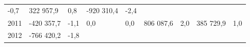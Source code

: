 \begin{longtable}[]{@{}lllllllll@{}}
\begin{minipage}[t]{0.06\columnwidth}
-0,7\strut
\end{minipage} & \begin{minipage}[t]{0.12\columnwidth}\raggedright
322 957,9\strut
\end{minipage} & \begin{minipage}[t]{0.06\columnwidth}\raggedright
0,8\strut
\end{minipage} & \begin{minipage}[t]{0.10\columnwidth}\raggedright
-920 310,4\strut
\end{minipage} & \begin{minipage}[t]{0.06\columnwidth}\raggedright
-2,4\strut
\end{minipage}\tabularnewline
\begin{minipage}[t]{0.05\columnwidth}\raggedright
2011\strut
\end{minipage} & \begin{minipage}[t]{0.10\columnwidth}\raggedright
-420 357,7\strut
\end{minipage} & \begin{minipage}[t]{0.06\columnwidth}\raggedright
-1,1\strut
\end{minipage} & \begin{minipage}[t]{0.16\columnwidth}\raggedright
0,0\strut
\end{minipage} & \begin{minipage}[t]{0.06\columnwidth}\raggedright
0,0\strut
\end{minipage} & \begin{minipage}[t]{0.12\columnwidth}\raggedright
806 087,6\strut
\end{minipage} & \begin{minipage}[t]{0.06\columnwidth}\raggedright
2,0\strut
\end{minipage} & \begin{minipage}[t]{0.10\columnwidth}\raggedright
385 729,9\strut
\end{minipage} & \begin{minipage}[t]{0.06\columnwidth}\raggedright
1,0\strut
\end{minipage}\tabularnewline
\begin{minipage}[t]{0.05\columnwidth}\raggedright
2012\strut
\end{minipage} & \begin{minipage}[t]{0.10\columnwidth}\raggedright
-766 420,2\strut
\end{minipage} & \begin{minipage}[t]{0.06\columnwidth}\raggedright
-1,8\strut
\end{minipage} & \begin{minipage}[t]{0.16\columnwidth}\raggedright

\end{minipage}
\end{longtable}
